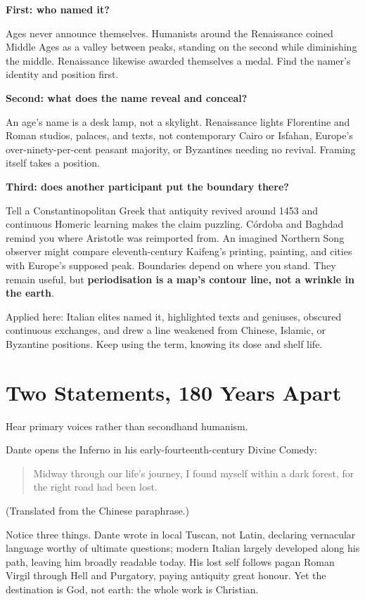 \textbf{First: who named it?}

Ages never announce themselves. Humanists around the Renaissance coined Middle Ages as a valley between peaks, standing on the second while diminishing the middle. Renaissance likewise awarded themselves a medal. Find the namer's identity and position first.

\textbf{Second: what does the name reveal and conceal?}

An age's name is a desk lamp, not a skylight. Renaissance lights Florentine and Roman studios, palaces, and texts, not contemporary Cairo or Isfahan, Europe's over-ninety-per-cent peasant majority, or Byzantines needing no revival. Framing itself takes a position.

\textbf{Third: does another participant put the boundary there?}

Tell a Constantinopolitan Greek that antiquity revived around 1453 and continuous Homeric learning makes the claim puzzling. Córdoba and Baghdad remind you where Aristotle was reimported from. An imagined Northern Song observer might compare eleventh-century Kaifeng's printing, painting, and cities with Europe's supposed peak. Boundaries depend on where you stand. They remain useful, but \textbf{periodisation is a map's contour line, not a wrinkle in the earth}.

Applied here: Italian elites named it, highlighted texts and geniuses, obscured continuous exchanges, and drew a line weakened from Chinese, Islamic, or Byzantine positions. Keep using the term, knowing its dose and shelf life.

\section{Two Statements, 180 Years Apart}
Hear primary voices rather than secondhand humanism.

Dante opens the Inferno in his early-fourteenth-century Divine Comedy:

\begin{quote}
Midway through our life's journey, I found myself within a dark forest, for the right road had been lost.
\end{quote}
(Translated from the Chinese paraphrase.)

Notice three things. Dante wrote in local Tuscan, not Latin, declaring vernacular language worthy of ultimate questions; modern Italian largely developed along his path, leaving him broadly readable today. His lost self follows pagan Roman Virgil through Hell and Purgatory, paying antiquity great honour. Yet the destination is God, not earth: the whole work is Christian.

